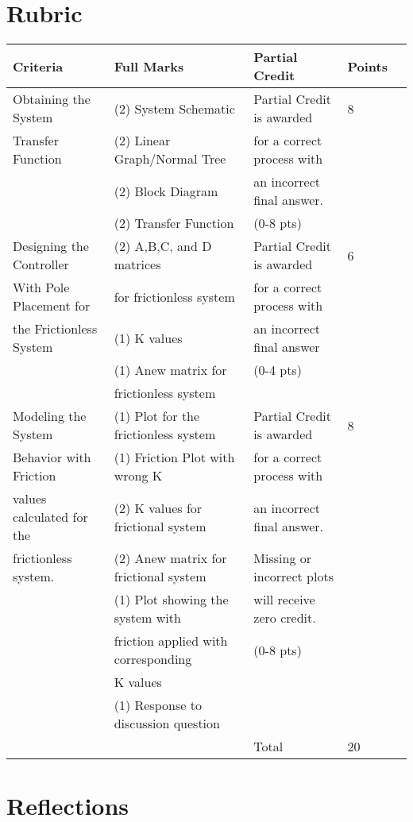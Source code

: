 \documentclass{homework}
\begin{document}
\section*{Rubric}

\begin{center}
\begin{tabular}{ | l | l | l | l | l |}
\hline
Criteria & Full Marks & Partial Credit & Points\\ \hline
Obtaining the System & (2) System Schematic & Partial Credit is awarded & 8 \\Transfer Function&(2) Linear Graph/Normal Tree &  for a correct process with & \\&(2) Block Diagram &  an incorrect final answer. & \\&(2) Transfer Function &  (0-8 pts) &
 \\ \hline
Designing the Controller & (2) A,B,C, and D matrices  & Partial Credit is awarded & 6\\With Pole Placement for & for frictionless system &for a correct process with&\\the Frictionless System & (1) K values & an incorrect final answer & \\ & (1) Anew matrix for & (0-4 pts) & \\ & frictionless system & &\\ \hline


Modeling the System & (1) Plot for the frictionless system& Partial Credit is awarded & 8\\Behavior with Friction &  (1) Friction Plot with wrong K & for a correct process with & \\values calculated for the & (2) K values for frictional system & an incorrect final answer. & \\frictionless system. & (2) Anew matrix for frictional system & Missing or incorrect plots & \\&(1) Plot showing the system with & will receive zero credit. & \\&friction applied with corresponding & (0-8 pts)&\\ &K values & & \\&(1) Response to discussion question & &\\
\hline
 &  & Total & 20 \\ \hline
\end{tabular}
\end{center}
\newpage

\section*{Reflections}
\end{document}
